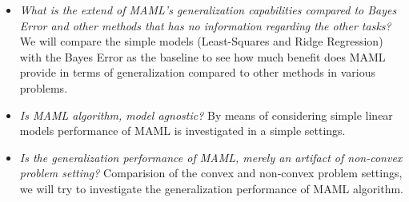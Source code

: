 \begin{itemize}
  \item \textit{What is the extend of MAML's generalization capabilities compared to Bayes Error and other methods that has no information regarding the other tasks?} We will compare the simple models (\eg Least-Squares and Ridge Regression) with the Bayes Error as the baseline to see how much benefit does MAML provide in terms of generalization compared to other methods in various problems.

  \item \textit{Is MAML algorithm, model agnostic?} By means of considering simple linear models performance of MAML is investigated in a simple settings. 

  \item \textit{Is the generalization performance of MAML, merely an artifact of non-convex problem setting?} Comparision of the convex and non-convex problem settings, we will try to investigate the generalization performance of MAML algorithm.

\end{itemize}



